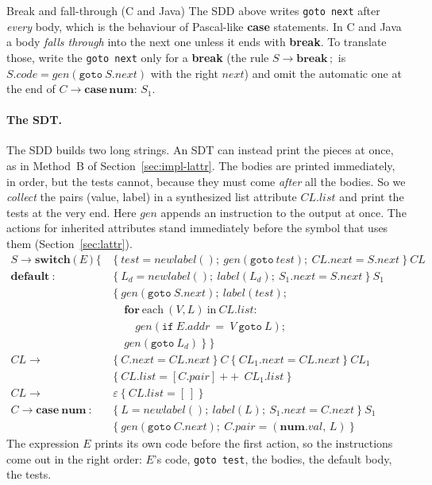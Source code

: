 \documentclass[11pt,a4paper]{article}
\newcommand{\at}[2]{\ensuremath{#1.\mathit{#2}}}
\newcommand{\tok}[1]{\ensuremath{\mathtt{#1}}}
\begin{document}
\begin{notebox}{Break and fall-through (C and Java)}
The SDD above writes \texttt{goto next} after \emph{every} body, which is the behaviour of Pascal-like \textbf{case} statements. In C and Java a body \emph{falls through} into the next one unless it ends with \textbf{break}. To translate those, write the \texttt{goto next} only for a \textbf{break} (the rule $S\to\mathbf{break}\,;$ is $\at{S}{code}=\mathit{gen}(\tok{goto}\ \at{S}{next})$ with the right $\mathit{next}$) and omit the automatic one at the end of $C\to\mathbf{case}\,\mathbf{num}:\,S_1$.
\end{notebox}

\paragraph{The SDT.} The SDD builds two long strings. An SDT can instead print the pieces at once, as in Method~B of Section~\ref{sec:impl-lattr}. The bodies are printed immediately, in order, but the tests cannot, because they must come \emph{after} all the bodies. So we \emph{collect} the pairs (value, label) in a synthesized list attribute \at{CL}{list} and print the tests at the very end. Here $\mathit{gen}$ appends an instruction to the output at once. The actions for inherited attributes stand immediately before the symbol that uses them (Section~\ref{sec:lattr}).
\begin{align*}
S \to \mathbf{switch}\ \tok{(}\,E\,\tok{)}\ \tok{\{}\ &\{\ \mathit{test}=\mathit{newlabel}();\ \mathit{gen}(\tok{goto}\ \mathit{test});\ \at{CL}{next}=\at{S}{next}\ \}\ \mathit{CL}\\
 \mathbf{default}\ \tok{:}\ &\{\ L_d=\mathit{newlabel}();\ \mathit{label}(L_d);\ \at{S_1}{next}=\at{S}{next}\ \}\ S_1\\
 &\{\ \mathit{gen}(\tok{goto}\ \at{S}{next});\ \mathit{label}(\mathit{test});\\
 &\quad\mathbf{for}\ \text{each}\ (V,L)\ \text{in}\ \at{CL}{list}:\\
 &\qquad\mathit{gen}(\tok{if}\ \at{E}{addr}\ \tok{=}\ V\ \tok{goto}\ L);\\
 &\quad\mathit{gen}(\tok{goto}\ L_d)\ \}\ \tok{\}}\\[6pt]
\mathit{CL} \to\ &\{\ \at{C}{next}=\at{CL}{next}\ \}\ C\ \{\ \at{CL_1}{next}=\at{CL}{next}\ \}\ \mathit{CL}_1\\
 &\{\ \at{CL}{list}=[\at{C}{pair}]\ \mathbin{+\!\!+}\ \at{CL_1}{list}\ \}\\
\mathit{CL} \to\ &\varepsilon\ \{\ \at{CL}{list}=[\ ]\ \}\\[6pt]
C \to \mathbf{case}\ \mathbf{num}\ \tok{:}\ &\{\ L=\mathit{newlabel}();\ \mathit{label}(L);\ \at{S_1}{next}=\at{C}{next}\ \}\ S_1\\
 &\{\ \mathit{gen}(\tok{goto}\ \at{C}{next});\ \at{C}{pair}=(\at{\mathbf{num}}{val},\,L)\ \}
\end{align*}
The expression $E$ prints its own code before the first action, so the instructions come out in the right order: $E$'s code, \texttt{goto test}, the bodies, the default body, the tests.
\end{document}
